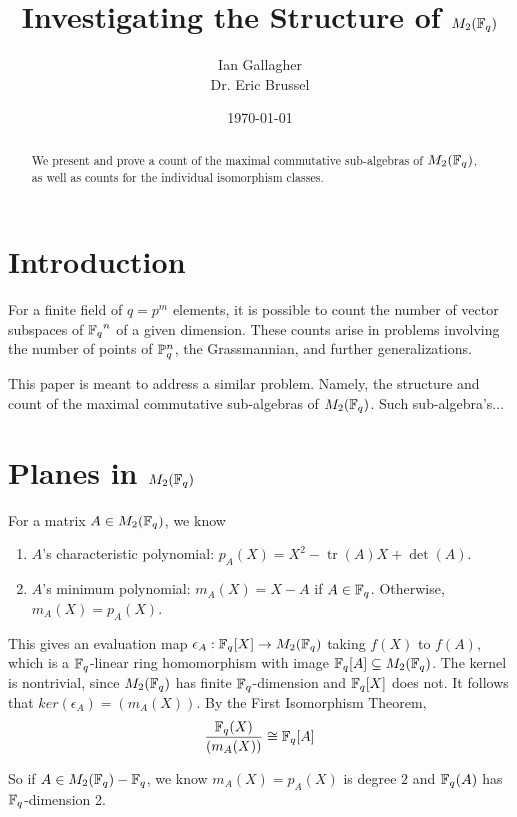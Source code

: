 \documentclass{amsart}
\title{Investigating the Structure of $M_2(\protect\mathbb{F}_q)$}
\author{Ian Gallagher \\ Dr. Eric Brussel}
\date{\today}
\begin{document}
\maketitle

\begin{abstract}
    We present and prove a count of the maximal commutative sub-algebras of
    $M_2(\protect\mathbb{F}_q)$, as well as counts for the individual isomorphism classes. 
\end{abstract}

\section{Introduction}
For a finite field of $q = p^m$ elements, it is possible to count the number of
vector subspaces of ${\protect\mathbb{F}_q}^n$ of a given dimension. These counts arise in
problems involving the number of points of $\protect\mathbb{P}^n_q$, the Grassmannian,
and further generalizations. %

This paper is meant to address a similar problem. Namely, the structure and 
count of the maximal commutative sub-algebras of $M_2(\protect\mathbb{F}_q)$. Such
sub-algebra's...

\section{Planes in $M_2(\protect\mathbb{F}_q)$}
    For a matrix $A \in M_2(\protect\mathbb{F}_q)$, we know
    \begin{enumerate}
        \item $A$'s characteristic polynomial: $p_A(X) = X^2 -\operatorname{tr}(A)X + \det(A)$.
        \item $A$'s minimum polynomial: $m_A(X) = X - A$ if $A \in \protect\mathbb{F}_q$. Otherwise, $m_A(X) = p_A(X)$.
    \end{enumerate}

    This gives an evaluation map $\epsilon_A : \protect\mathbb{F}_q[X] \rightarrow M_2(\protect\mathbb{F}_q)$ taking $f(X)$ to $f(A)$, which is a $\protect\mathbb{F}_q$-linear ring homomorphism with image $\protect\mathbb{F}_q[A] \subseteq M_2(\protect\mathbb{F}_q)$. The kernel is nontrivial, since $M_2(\protect\mathbb{F}_q)$ has finite $\protect\mathbb{F}_q$-dimension and $\protect\mathbb{F}_q[X]$ does not. It follows that $ker(\epsilon_A) = (m_A(X))$. By the First Isomorphism Theorem,
    \begin{align*}
        \frac{\protect\mathbb{F}_q(X)}{(m_A(X))} \cong \protect\mathbb{F}_q[A]
    \end{align*}

    So if $A \in M_2(\protect\mathbb{F}_q) - \protect\mathbb{F}_q$, we know $m_A(X) = p_A(X)$ is degree $2$ and $\protect\mathbb{F}_q(A)$ has $\protect\mathbb{F}_q$-dimension 2.
\end{document}
